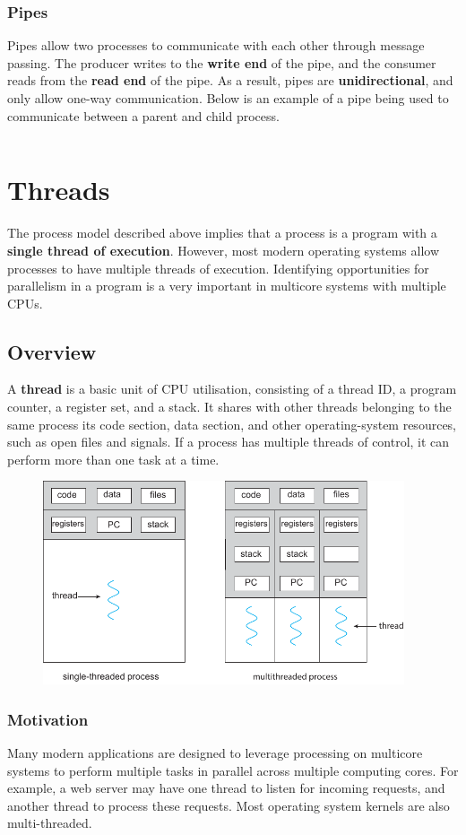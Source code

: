 \documentclass{article}
\begin{document}
\subsubsection{Pipes}
Pipes allow two processes to communicate with each other through
message passing. The producer writes to the \textbf{write end} of the
pipe, and the consumer reads from the \textbf{read end} of the pipe. As
a result, pipes are \textbf{unidirectional}, and only allow one-way
communication. Below is an example of a pipe being used to communicate
between a parent and child process.

\inputminted{c}{code/pipe.c}
\section{Threads}
The process model described above implies that a process is a program
with a \textbf{single thread of execution}. However, most modern
operating systems allow processes to have multiple threads of
execution. Identifying opportunities for parallelism in a program is a
very important in multicore systems with multiple CPUs.
\subsection{Overview}
A \textbf{thread} is a basic unit of CPU utilisation, consisting of a
thread ID, a program counter, a register set, and a stack. It shares
with other threads belonging to the same process its code section, data
section, and other operating-system resources, such as open files and
signals. If a process has multiple threads of control, it can perform
more than one task at a time.
\begin{figure}[H]
    \centering
    \includegraphics[height = 6cm]{figures/threads.pdf}
\end{figure}
\subsubsection{Motivation}
Many modern applications are designed to leverage processing on
multicore systems to perform multiple tasks in parallel across multiple
computing cores. For example, a web server may have one thread to
listen for incoming requests, and another thread to process these
requests. Most operating system kernels are also multi-threaded.
\end{document}
